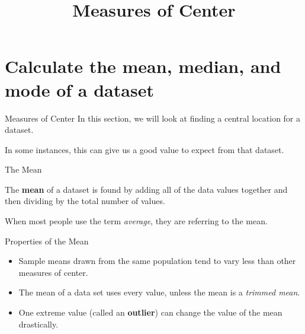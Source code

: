 \documentclass[t]{beamer}
\title{Measures of Center}
\author{}
\date{}
\begin{document}
\begin{frame} 
\maketitle
\end{frame}

\section{Calculate the mean, median, and mode of a dataset}

\begin{frame}{Measures of Center}
In this section, we will look at finding a central location for a dataset. \newline\\	\pause

In some instances, this can give us a good value to expect from that dataset.
\end{frame}

\begin{frame}{The Mean}
\begin{tcolorbox}[colframe=green!20!black, colback = green!30!white,title=\textbf{Mean}]
The \textbf{mean} of a dataset is found by adding all of the data values together and then dividing by the total number of values. 
\end{tcolorbox}
\vspace{11pt}	\pause

When most people use the term \textit{average}, they are referring to the mean.
\end{frame}

\begin{frame}{Properties of the Mean}
\begin{itemize}
	\item<+-> Sample means drawn from the same population tend to vary less than other measures of center.	\newline\\
	\item<+-> The mean of a data set uses every value, unless the mean is a \textit{trimmed mean}.	\newline\\
	\item<+-> One extreme value (called an {\color{blue}\textbf{outlier}}) can change the value of the mean drastically.	\newline\\
\end{itemize}
\end{frame}
\end{document}
